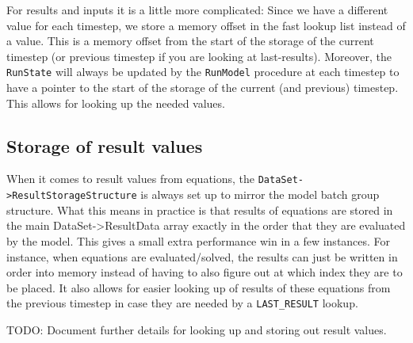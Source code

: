 \documentclass[11pt]{article}
\theoremstyle{definition}
\begin{document}
For results and inputs it is a little more complicated: Since we have a different value for each timestep, we store a memory offset in the fast lookup list instead of a value. This is a memory offset from the start of the storage of the current timestep (or previous timestep if you are looking at last-results). Moreover, the {\tt RunState} will always be updated by the {\tt RunModel} procedure at each timestep to have a pointer to the start of the storage of the current (and previous) timestep. This allows for looking up the needed values.

\subsection{Storage of result values}

When it comes to result values from equations, the {\tt DataSet->ResultStorageStructure} is always set up to mirror the model batch group structure. What this means in practice is that results of equations are stored in the main DataSet->ResultData array exactly in the order that they are evaluated by the model. This gives a small extra performance win in a few instances. For instance, when equations are evaluated/solved, the results can just be written in order into memory instead of having to also figure out at which index they are to be placed. It also allows for easier looking up of results of these equations from the previous timestep in case they are needed by a {\tt LAST\_RESULT} lookup.

TODO: Document further details for looking up and storing out result values.
\end{document}
